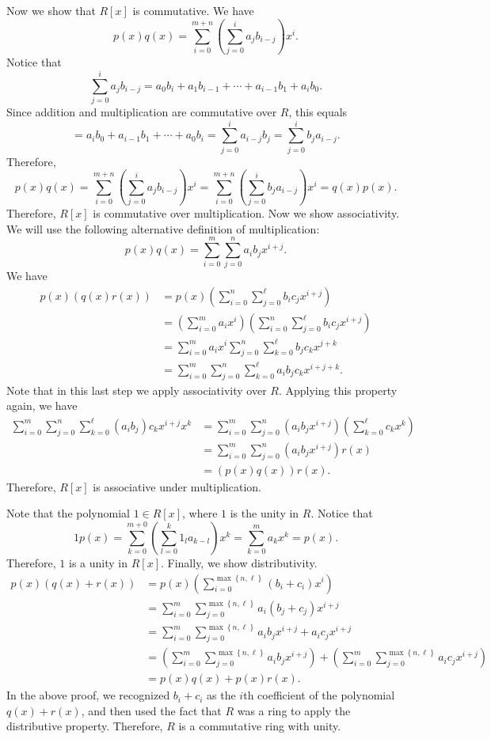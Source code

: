 \documentclass[11pt, letterpaper]{report}
\begin{document}
Now we show that $R[x]$ is commutative. We have
\[
	p(x)q(x)=\sum_{i=0}^{m+n} \left( \sum_{j=0}^{i} a_jb_{i-j} \right) x^i
.\]
Notice that
\[
	\sum_{j=0}^{i} a_jb_{i-j}=a_0b_{i}+a_1b_{i-1}+\cdots+a_{i-1}b_1+a_ib_0
.\]
Since addition and multiplication are commutative over $R$, this equals
\[
	=a_ib_0+a_{i-1}b_1+\cdots+a_0b_{i}=\sum_{j=0}^{i} a_{i-j}b_j=\sum_{j=0}^{i} b_ja_{i-j}	
.\]
Therefore,
\[
	p(x)q(x)=\sum_{i=0}^{m+n} \left( \sum_{j=0}^{i} a_jb_{i-j} \right) x^i=\sum_{i=0}^{m+n} \left(\sum_{j=0}^{i} b_ja_{i-j}\right)x^i=q(x)p\left( x \right) 
.\]
Therefore, $R[x]$ is commutative over multiplication. Now we show associativity. We will use the following alternative definition of multiplication:
\[
	p(x)q(x)=\sum_{i=0}^{m} \sum_{j=0}^{n} a_ib_jx^{i+j}
.\]
We have
\begin{align*}
	p(x)\left( q(x)r(x) \right) &=p(x)\left( \sum_{i=0}^{n} \sum_{j=0}^{\ell } b_ic_jx^{i+j} \right) \\
				    &=\left( \sum_{i=0}^{m} a_ix^i \right)\left( \sum_{i=0}^{n} \sum_{j=0}^{\ell } b_ic_jx^{i+j} \right)  \\
				    &=\sum_{i=0}^{m} a_ix^i \sum_{j=0}^{n} \sum_{k=0}^{\ell } b_jc_kx^{j+k}\\
				    &=\sum_{i=0}^{m} \sum_{j=0}^{n} \sum_{k=0}^{\ell } a_ib_jc_kx^{i+j+k}
.\end{align*}
Note that in this last step we apply associativity over $R$. Applying this property again, we have
\begin{align*}
	\sum_{i=0}^{m} \sum_{j=0}^{n} \sum_{k=0}^{\ell }\left( a_ib_j \right) c_kx^{i+j}x^k&=\sum_{i=0}^{m} \sum_{j=0}^{n}\left( a_ib_jx^{i+j}\right)\left( \sum_{k=0}^{\ell } c_kx^k \right) \\
											   &=\sum_{i=0}^{m} \sum_{j=0}^{n} \left(a_ib_jx^{i+j}\right)r\left( x \right) \\
											   &=\left( p(x)q(x) \right) r(x)
.\end{align*}
Therefore, $R[x]$ is associative under multiplication.

Note that the polynomial $1\in R[x]$, where $1$ is the unity in $R$. Notice that
\[
	1p(x)=\sum_{k=0}^{m+0} \left( \sum_{l=0}^{k} 1_la_{k-l} \right)x^k =\sum_{k=0}^{m} a_kx^k=p(x)
.\]
Therefore, $1$ is a unity in $R[x]$. Finally, we show distributivity.
\begin{align*}
	p(x)\left( q(x)+r(x) \right) &=p(x)\left( \sum_{i=0}^{\max \left\{ n,\ell  \right\} } \left( b_i+c_i \right) x^i \right)\\
				     &=\sum_{i=0}^{m} \sum_{j=0}^{\max \left\{ n,\ell  \right\} } a_i\left( b_j+c_j \right) x^{i+j}\\
				     &=\sum_{i=0}^{m} \sum_{j=0}^{\max \left\{ n,\ell  \right\} } a_ib_jx^{i+j}+a_ic_jx^{i+j}\\
				     &=\left( \sum_{i=0}^{m} \sum_{j=0}^{\max \left\{ n,\ell  \right\} } a_ib_jx^{i+j} \right) +\left( \sum_{i=0}^{m} \sum_{j=0}^{\max \left\{ n,\ell  \right\} } a_ic_jx^{i+j} \right) \\
				     &=p(x)q(x)+p(x)r(x)
.\end{align*}
In the above proof, we recognized $b_i+c_i$ as the $i$th coefficient of the polynomial $q(x)+r(x)$, and then used the fact that $R$ was a ring to apply the distributive property. Therefore, $R$ is a commutative ring with unity.
\end{document}
